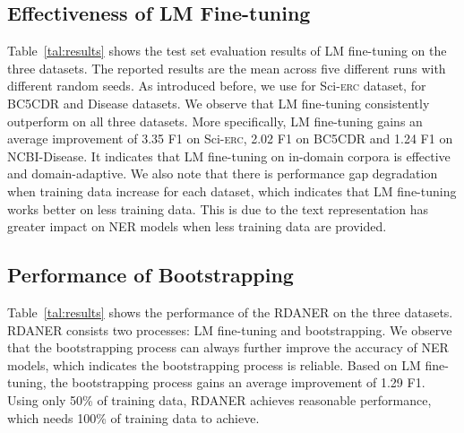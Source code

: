 \documentclass[10pt, conference, compsocconf]{IEEEtran}
\newcommand{\Scierc}{\textsc{S}ci-\textsc{erc}\xspace}
\newcommand{\rdaner}{\textsc{RDANER}\xspace}
\newcommand{\bertcs}{\xspace}
\newcommand{\bertbio}{\xspace}
\newcommand{\bertbase}{\xspace}
\begin{document}
\subsection{Effectiveness of LM Fine-tuning}

Table~\ref{tal:results} shows the test set evaluation 
results of LM fine-tuning on the three datasets. 
The reported results are the mean across five different runs with different random seeds.
As introduced before, we use \bertcs for \Scierc dataset, \bertbio for BC5CDR and Disease datasets.
We observe that LM fine-tuning consistently outperform \bertbase on all three datasets.
More specifically, LM fine-tuning gains an average improvement of 3.35 F1 
on \Scierc, 2.02 F1 on BC5CDR and 1.24 F1 on NCBI-Disease. It indicates that 
LM fine-tuning on in-domain corpora is effective and domain-adaptive.
We also note that there is performance gap degradation when training data increase for each dataset,
which indicates that LM fine-tuning works better on less training data.
This is due to the text representation has greater impact on NER models
when less training data are provided. 















\subsection{Performance of Bootstrapping}

Table~\ref{tal:results} shows the performance of the \rdaner on the three datasets.
\rdaner consists two processes: LM fine-tuning and bootstrapping. 
We observe that the bootstrapping process can always further improve the accuracy of NER models, which indicates
the bootstrapping process is reliable.
Based on LM fine-tuning, the bootstrapping process gains an average improvement of 1.29 F1.
Using only 50\% of training data, \rdaner achieves reasonable performance, which
\bertbase needs 100\% of training data to achieve.
\end{document}
